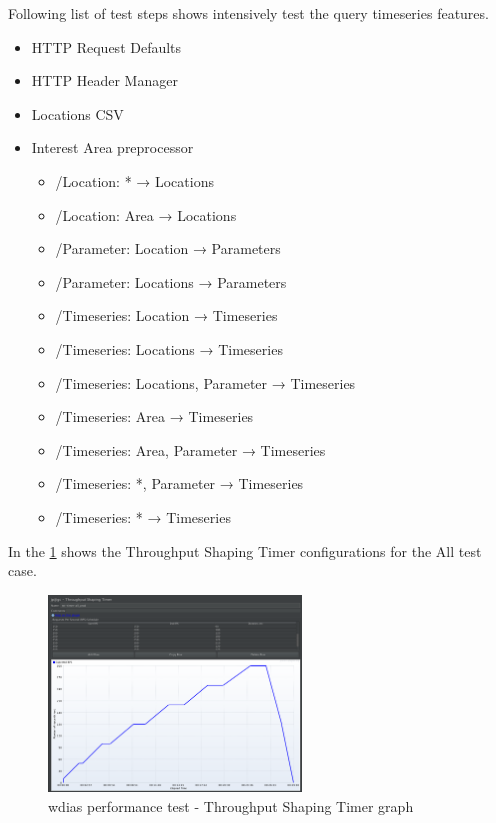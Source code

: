 Following list of test steps shows intensively test the query timeseries features.

\begin{itemize}
    \item HTTP Request Defaults
    \item HTTP Header Manager
    \item Locations CSV
    \item Interest Area preprocessor
    \begin{itemize}
        \item /Location: * → Locations
    	\item /Location: Area → Locations
    	\item /Parameter: Location → Parameters
    	\item /Parameter: Locations → Parameters
    	\item /Timeseries: Location → Timeseries
    	\item /Timeseries: Locations → Timeseries
    	\item /Timeseries: Locations, Parameter → Timeseries
    	\item /Timeseries: Area → Timeseries
    	\item /Timeseries: Area, Parameter → Timeseries
    	\item /Timeseries: *, Parameter → Timeseries
    	\item /Timeseries: * → Timeseries
	\end{itemize}
\end{itemize}

In the \ref{fi:test_prod_throughtput_shaping_timer} shows the Throughput Shaping Timer configurations for the All test case.

\begin{figure}[htp]
    \centering
    \includegraphics[width=0.6\textwidth]{results/work_load/test_prod_throughtput_shaping_timer.png}
    \caption{\acrshort{wdias} performance test - Throughput Shaping Timer graph}
    \label{fi:test_prod_throughtput_shaping_timer}
\end{figure}

